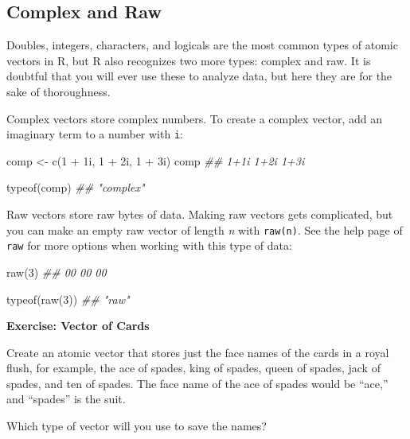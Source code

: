 \documentclass[
  letterpaper,
  DIV=11,
  numbers=noendperiod]{scrbook}
\newenvironment{Shaded}{\begin{snugshade}}{\end{snugshade}}
\newcommand{\DecValTok}[1]{\textcolor[rgb]{0.68,0.00,0.00}{#1}}
\newcommand{\DocumentationTok}[1]{\textcolor[rgb]{0.37,0.37,0.37}{\textit{#1}}}
\newcommand{\FunctionTok}[1]{\textcolor[rgb]{0.28,0.35,0.67}{#1}}
\newcommand{\NormalTok}[1]{\textcolor[rgb]{0.00,0.23,0.31}{#1}}
\newcommand{\OtherTok}[1]{\textcolor[rgb]{0.00,0.23,0.31}{#1}}
\newcommand{\SpecialCharTok}[1]{\textcolor[rgb]{0.37,0.37,0.37}{#1}}
\begin{document}
\subsection{Complex and Raw}\label{complex-and-raw}

Doubles, integers, characters, and logicals are the most common types of
atomic vectors in R, but R also recognizes two more types: complex and
raw. It is doubtful that you will ever use these to analyze data, but
here they are for the sake of thoroughness.

Complex vectors store complex numbers. To create a complex vector, add
an imaginary term to a number with \texttt{i}:

\begin{Shaded}
\begin{Highlighting}[]
\NormalTok{comp }\OtherTok{\textless{}{-}} \FunctionTok{c}\NormalTok{(}\DecValTok{1} \SpecialCharTok{+} \DecValTok{1}\NormalTok{i, }\DecValTok{1} \SpecialCharTok{+} \DecValTok{2}\NormalTok{i, }\DecValTok{1} \SpecialCharTok{+} \DecValTok{3}\NormalTok{i)}
\NormalTok{comp}
\DocumentationTok{\#\# 1+1i 1+2i 1+3i}

\FunctionTok{typeof}\NormalTok{(comp)}
\DocumentationTok{\#\# "complex"}
\end{Highlighting}
\end{Shaded}

Raw vectors store raw bytes of data. Making raw vectors gets
complicated, but you can make an empty raw vector of length \emph{n}
with \texttt{raw(n)}. See the help page of \texttt{raw} for more options
when working with this type of data:

\begin{Shaded}
\begin{Highlighting}[]
\FunctionTok{raw}\NormalTok{(}\DecValTok{3}\NormalTok{)}
\DocumentationTok{\#\# 00 00 00}

\FunctionTok{typeof}\NormalTok{(}\FunctionTok{raw}\NormalTok{(}\DecValTok{3}\NormalTok{))}
\DocumentationTok{\#\# "raw"}
\end{Highlighting}
\end{Shaded}

\begin{tcolorbox}[enhanced jigsaw, left=2mm, breakable, colback=white, colframe=quarto-callout-color-frame, leftrule=.75mm, bottomrule=.15mm, arc=.35mm, opacityback=0, rightrule=.15mm, toprule=.15mm]

\vspace{-3mm}\textbf{Exercise: Vector of Cards}\vspace{3mm}

Create an atomic vector that stores just the face names of the cards in
a royal flush, for example, the ace of spades, king of spades, queen of
spades, jack of spades, and ten of spades. The face name of the ace of
spades would be ``ace,'' and ``spades'' is the suit.

Which type of vector will you use to save the names?

\end{tcolorbox}
\end{document}
